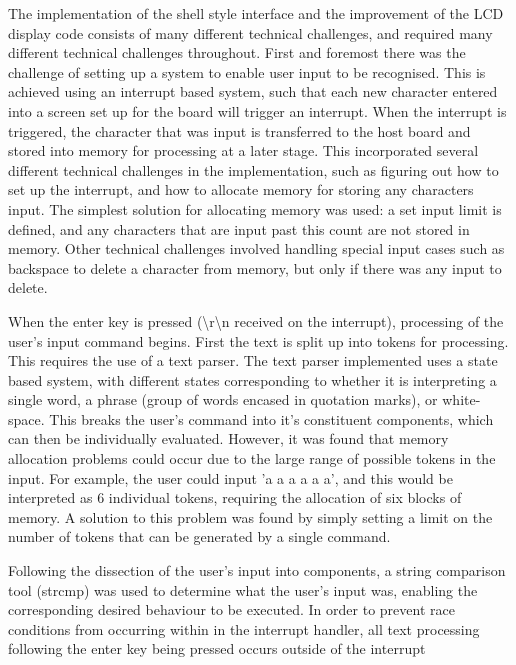 The implementation of the shell style interface and the improvement of the LCD 
display code consists of many different technical challenges, and required many 
different technical challenges throughout. First and foremost there was the 
challenge of setting up a system to enable user input to be recognised. This is 
achieved using an interrupt based system, such that each new character entered 
into a screen set up for the board will trigger an interrupt. When the 
interrupt is triggered, the character that was input is transferred to the host 
board and stored into memory for processing at a later stage. This incorporated 
several different technical challenges in the implementation, such as figuring 
out how to set up the interrupt, and how to allocate memory for storing any 
characters input. The simplest solution for allocating memory was used: a set 
input limit is defined, and any characters that are input past this count are 
not stored in memory. Other technical challenges involved handling special input 
cases such as backspace to delete a character from memory, but only if there 
was any input to delete. 
\par\bigskip\noindent
When the enter key is pressed (\textbackslash r\textbackslash n received on 
the interrupt), processing of the user's input command begins. 
First the text is split up into tokens for processing. This 
requires the use of a text parser. The text parser implemented uses a state 
based system, with different states corresponding to whether it is interpreting 
a single word, a phrase (group of words encased in quotation marks), or 
white-space. This breaks the user's command into it's constituent components, 
which can then be individually evaluated. However, it was found that memory 
allocation problems could occur due to the large range of possible tokens in 
the input. For example, the user could input 'a a a a a a', and this would be 
interpreted as 6 individual tokens, requiring the allocation of six blocks of 
memory. A solution to this problem was found by simply setting a limit on the 
number of tokens that can be generated by a single command. 
\par\bigskip\noindent
Following the dissection of the user's input into components, a string 
comparison tool (strcmp) was used to determine what the user's input was, 
enabling the corresponding desired behaviour to be executed. In order to 
prevent race conditions from occurring within in the interrupt handler, all text 
processing following the enter key being pressed occurs outside of the interrupt 
